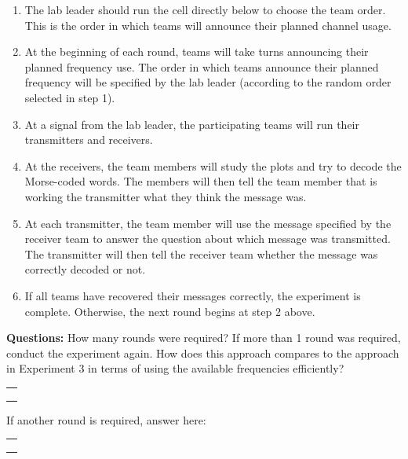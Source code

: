 \documentclass[11pt]{article}
\providecommand{\tightlist}{%
      \setlength{\itemsep}{0pt}\setlength{\parskip}{0pt}}
\begin{document}
\begin{enumerate}
\def\labelenumi{\arabic{enumi}.}
\tightlist
\item
  The lab leader should run the cell directly below to choose the team
  order. This is the order in which teams will announce their planned
  channel usage.
\item
  At the beginning of each round, teams will take turns announcing their
  planned frequency use. The order in which teams announce their planned
  frequency will be specified by the lab leader (according to the random
  order selected in step 1).
\item
  At a signal from the lab leader, the participating teams will run
  their transmitters and receivers.
\item
  At the receivers, the team members will study the plots and try to
  decode the Morse-coded words. The members will then tell the team
  member that is working the transmitter what they think the message
  was.
\item
  At each transmitter, the team member will use the message specified by
  the receiver team to answer the question about which message was
  transmitted. The transmitter will then tell the receiver team whether
  the message was correctly decoded or not.
\item
  If all teams have recovered their messages correctly, the experiment
  is complete. Otherwise, the next round begins at step 2 above.
\end{enumerate}

\textbf{Questions:} How many rounds were required? If more than 1 round
was required, conduct the experiment again. How does this approach
compares to the approach in Experiment 3 in terms of using the available
frequencies efficiently?

\begin{longtable}[]{@{}l@{}}
\toprule
 \\
\midrule
\endhead
 \\
 \\
 \\
\bottomrule
\end{longtable}

If another round is required, answer here:

\begin{longtable}[]{@{}l@{}}
\toprule
 \\
\midrule
\endhead
 \\
 \\
 \\
\bottomrule
\end{longtable}
\end{document}
